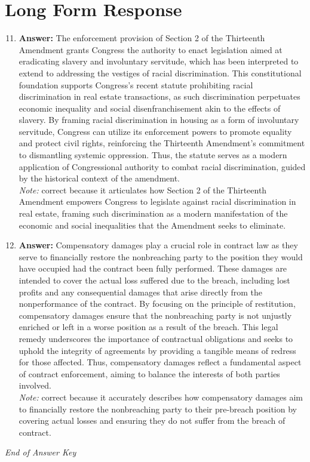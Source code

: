 \documentclass[12pt]{article}
\begin{document}
\section*{Long Form Response}
\begin{enumerate}[label=\arabic*.]
\setcounter{enumi}{10}
\item \textbf{Answer:} The enforcement provision of Section 2 of the Thirteenth Amendment grants Congress the authority to enact legislation aimed at eradicating slavery and involuntary servitude, which has been interpreted to extend to addressing the vestiges of racial discrimination. This constitutional foundation supports Congress's recent statute prohibiting racial discrimination in real estate transactions, as such discrimination perpetuates economic inequality and social disenfranchisement akin to the effects of slavery. By framing racial discrimination in housing as a form of involuntary servitude, Congress can utilize its enforcement powers to promote equality and protect civil rights, reinforcing the Thirteenth Amendment's commitment to dismantling systemic oppression. Thus, the statute serves as a modern application of Congressional authority to combat racial discrimination, guided by the historical context of the amendment.
\\ \textit{Note:} correct because it articulates how Section 2 of the Thirteenth Amendment empowers Congress to legislate against racial discrimination in real estate, framing such discrimination as a modern manifestation of the economic and social inequalities that the Amendment seeks to eliminate.
\item \textbf{Answer:} Compensatory damages play a crucial role in contract law as they serve to financially restore the nonbreaching party to the position they would have occupied had the contract been fully performed. These damages are intended to cover the actual loss suffered due to the breach, including lost profits and any consequential damages that arise directly from the nonperformance of the contract. By focusing on the principle of restitution, compensatory damages ensure that the nonbreaching party is not unjustly enriched or left in a worse position as a result of the breach. This legal remedy underscores the importance of contractual obligations and seeks to uphold the integrity of agreements by providing a tangible means of redress for those affected. Thus, compensatory damages reflect a fundamental aspect of contract enforcement, aiming to balance the interests of both parties involved.
\\ \textit{Note:} correct because it accurately describes how compensatory damages aim to financially restore the nonbreaching party to their pre-breach position by covering actual losses and ensuring they do not suffer from the breach of contract.
\end{enumerate}

\vfill
\noindent\textit{End of Answer Key}
\end{document}
